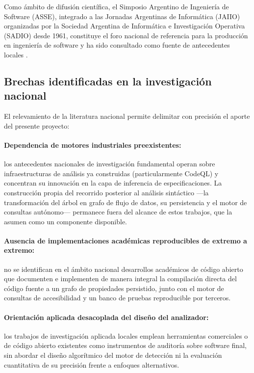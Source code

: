 Como ámbito de difusión científica, el Simposio Argentino de Ingeniería de Software (ASSE), integrado a las Jornadas Argentinas de Informática (JAIIO) organizadas por la Sociedad Argentina de Informática e Investigación Operativa (SADIO) desde 1961, constituye el foro nacional de referencia para la producción en ingeniería de software y ha sido consultado como fuente de antecedentes locales \citep{sadioasse}.

\subsection{Brechas identificadas en la investigación nacional}\label{sec:n3.1.2}

El relevamiento de la literatura nacional permite delimitar con precisión el aporte del presente proyecto:

\paragraph{Dependencia de motores industriales preexistentes:} los antecedentes nacionales de investigación fundamental operan sobre infraestructuras de análisis ya construidas (particularmente CodeQL) y concentran su innovación en la capa de inferencia de especificaciones. La construcción propia del recorrido posterior al análisis sintáctico —la transformación del árbol en grafo de flujo de datos, su persistencia y el motor de consultas autónomo— permanece fuera del alcance de estos trabajos, que la asumen como un componente disponible.

\paragraph{Ausencia de implementaciones académicas reproducibles de extremo a extremo:} no se identifican en el ámbito nacional desarrollos académicos de código abierto que documenten e implementen de manera integral la compilación directa del código fuente a un grafo de propiedades persistido, junto con el motor de consultas de accesibilidad y un banco de pruebas reproducible por terceros.

\paragraph{Orientación aplicada desacoplada del diseño del analizador:} los trabajos de investigación aplicada locales emplean herramientas comerciales o de código abierto existentes como instrumentos de auditoría sobre software final, sin abordar el diseño algorítmico del motor de detección ni la evaluación cuantitativa de su precisión frente a enfoques alternativos.

